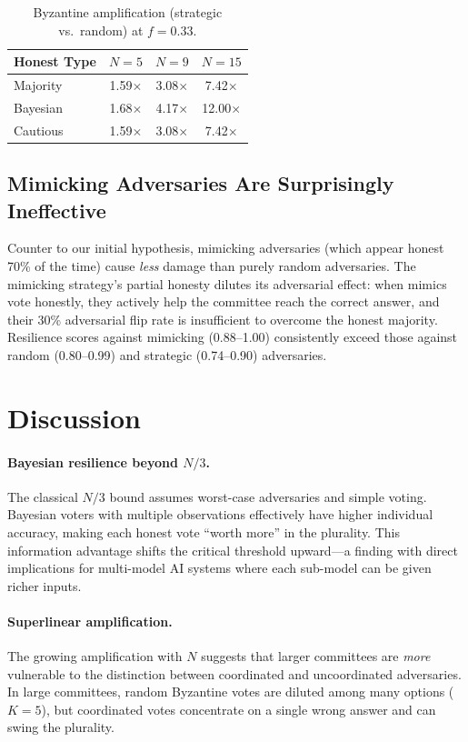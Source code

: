 \documentclass[11pt]{article}
\begin{document}
\begin{table}[h]
\centering
\caption{Byzantine amplification (strategic vs.\ random) at $f = 0.33$.}
\label{tab:amplification}
\begin{tabular}{lccc}
\toprule
Honest Type & $N=5$ & $N=9$ & $N=15$ \\
\midrule
Majority  & 1.59$\times$ & 3.08$\times$ & 7.42$\times$ \\
Bayesian  & 1.68$\times$ & 4.17$\times$ & 12.00$\times$ \\
Cautious  & 1.59$\times$ & 3.08$\times$ & 7.42$\times$ \\
\bottomrule
\end{tabular}
\end{table}

\subsection{Mimicking Adversaries Are Surprisingly Ineffective}

Counter to our initial hypothesis, mimicking adversaries (which appear honest 70\% of the time) cause \emph{less} damage than purely random adversaries.
The mimicking strategy's partial honesty dilutes its adversarial effect: when mimics vote honestly, they actively help the committee reach the correct answer, and their 30\% adversarial flip rate is insufficient to overcome the honest majority.
Resilience scores against mimicking (0.88--1.00) consistently exceed those against random (0.80--0.99) and strategic (0.74--0.90) adversaries.

\section{Discussion}

\paragraph{Bayesian resilience beyond $N/3$.}
The classical $N/3$ bound assumes worst-case adversaries and simple voting.
Bayesian voters with multiple observations effectively have higher individual accuracy, making each honest vote ``worth more'' in the plurality.
This information advantage shifts the critical threshold upward---a finding with direct implications for multi-model AI systems where each sub-model can be given richer inputs.

\paragraph{Superlinear amplification.}
The growing amplification with $N$ suggests that larger committees are \emph{more} vulnerable to the distinction between coordinated and uncoordinated adversaries.
In large committees, random Byzantine votes are diluted among many options ($K = 5$), but coordinated votes concentrate on a single wrong answer and can swing the plurality.
\end{document}
